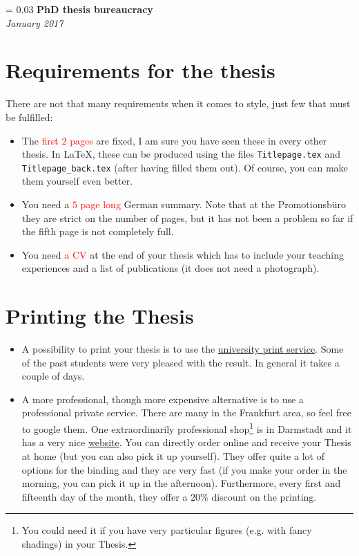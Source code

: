 \documentclass[a4paper]{article}
\newlength{\titleVerticalSpacing}
\newcommand{\myTitle}[2]{%
    \begingroup
        \titleVerticalSpacing = 0.03\textheight
        \centering
        \vspace*{\titleVerticalSpacing}
        {\Huge\bfseries #1}\\[\baselineskip]
        {\itshape #2}\\[3\baselineskip]
    \endgroup
}
\begin{document}
    
    \myTitle{PhD thesis bureaucracy}{January 2017}

    \section*{Requirements for the thesis}
        There are not that many requirements when it comes to style, just few that must be fulfilled:
        \begin{itemize}
            \item The \textcolor{red}{first $2$ pages} are fixed, I am sure you have seen these in every other thesis.
                  In \LaTeX, these can be produced using the files \texttt{Titlepage.tex} and \texttt{Titlepage\_back.tex} (after having filled them out).
                  Of course, you can make them yourself even better.
            \item You need a \textcolor{red}{$5$ page long} German summary. Note that at the Promotionsb\"uro they are strict on the number of pages, but it has not been a problem so far if the fifth page is not completely full.
            \item You need \textcolor{red}{a CV} at the end of your thesis which has to include your teaching experiences and a list of publications (it does not need a photograph).
        \end{itemize}
        
        
    \section*{Printing the Thesis}
        \begin{itemize}
            \item A possibility to print your thesis is to use the \href{http://druck.uni-frankfurt.de/druckzentrum/}{university print service}.
                  Some of the past students were very pleased with the result.
                  In general it takes a couple of days.
            \item A more professional, though more expensive alternative is to use a professional private service.
                  There are many in the Frankfurt area, so feel free to google them.
                  One extraordinarily professional shop\footnote{You could need it if you have very particular figures (e.g. with fancy shadings) in your Thesis.} is in Darmstadt and it has a very nice \href{http://www.der-felger.de/}{website}.
                  You can directly order online and receive your Thesis at home (but you can also pick it up yourself).
                  They offer quite a lot of options for the binding and they are very fast (if you make your order in the morning, you can pick it up in the afternoon). Furthermore, every first and fifteenth day of the month, they offer a 20\% discount on the printing.
        \end{itemize}
        
\end{document}
